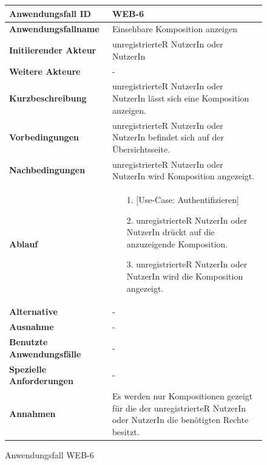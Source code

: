 \begin{figure}[h]
	\centering
	\begin{tabularx}{\textwidth}{ X | X }
		\textbf{Anwendungsfall ID} & WEB-6 \\ \hline
		\textbf{Anwendungsfallname} & Einsehbare Komposition anzeigen \\ \hline
		\textbf{Initiierender Akteur} & unregistrierteR NutzerIn oder NutzerIn \\ \hline
		\textbf{Weitere Akteure} & - \\ \hline
		\textbf{Kurzbeschreibung} & unregistrierteR NutzerIn oder NutzerIn lässt sich eine Komposition anzeigen. \\ \hline
		\textbf{Vorbedingungen} & unregistrierteR NutzerIn oder NutzerIn befindet sich auf der Übersichtsseite. \\ \hline
		\textbf{Nachbedingungen} & unregistrierteR NutzerIn oder NutzerIn wird Komposition angezeigt. \\ \hline
		\textbf{Ablauf} &
		\begin{enumerate}
			\item[1.] [Use-Case: Authentifizieren]
			\item[2.] unregistrierteR NutzerIn oder NutzerIn drückt auf die anzuzeigende Komposition.
			\item[3.] unregistrierteR NutzerIn oder NutzerIn wird die Komposition angezeigt.
		\end{enumerate} \\ \hline
		\textbf{Alternative} & - \\ \hline
		\textbf{Ausnahme} & - \\ \hline
		\textbf{Benutzte Anwendungsfälle} & - \\ \hline
		\textbf{Spezielle Anforderungen} & - \\ \hline
		\textbf{Annahmen} & Es werden nur Kompositionen gezeigt für die der unregistrierteR NutzerIn oder NutzerIn die benötigten Rechte besitzt.
	\end{tabularx}
	\caption{Anwendungsfall WEB-6}
	\label{fig:anwendungsfall-server-tabelle-web-6}
\end{figure}
